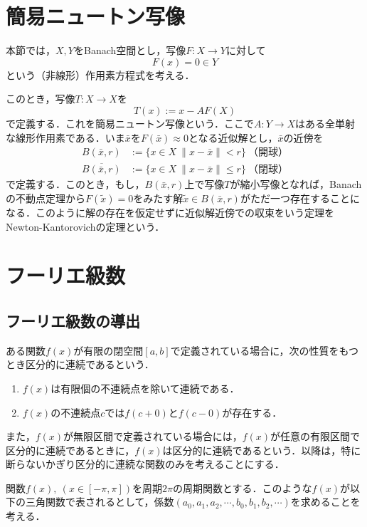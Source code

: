 \documentclass[11pt,a4paper,titlepage]{jsreport}
\theoremstyle{definition}
\begin{document}
\section{簡易ニュートン写像}
本節では，$X,Y$をBanach空間とし，写像$F:X\rightarrow Y$に対して
\begin{equation*}
  F(x)=0 \in Y
\end{equation*}
という（非線形）作用素方程式を考える．

このとき，写像$T:X\rightarrow X$を
\begin{equation*}
  T(x):=x-AF(X)
\end{equation*}
で定義する．これを簡易ニュートン写像という．ここで$A:Y\rightarrow X$はある全単射な線形作用素である．いま$\bar{x}$を$F(\bar{x})\approx 0$となる近似解とし，$\bar{x}$の近傍を
\begin{align*}
  B(\bar{x},r)            & :=\{x\in X\:\|x-\bar{x}\|<r\}\ （開球）     \\
  \overline{B(\bar{x},r)} & :=\{x\in X\:\|x-\bar{x}\|\leq r\}\ （閉球）
\end{align*}
で定義する．このとき，もし，$B(\bar{x},r)$上で写像$T$が縮小写像となれば，Banachの不動点定理から$F(\tilde{x})=0$をみたす解$\tilde{x}\in B(\bar{x},r)$がただ一つ存在することになる．このように解の存在を仮定せずに近似解近傍での収束をいう定理をNewton-Kantorovichの定理という．

\section{フーリエ級数}
\subsection{フーリエ級数の導出}
ある関数$f(x)$が有限の閉空間$[a,b]$で定義されている場合に，次の性質をもつとき区分的に連続であるという．
\begin{enumerate}
  \item $f(x)$は有限個の不連続点を除いて連続である．
  \item $f(x)$の不連続点$c$では$f(c+0)$と$f(c-0)$が存在する．
\end{enumerate}

また，$f(x)$が無限区間で定義されている場合には，$f(x)$が任意の有限区間で区分的に連続であるときに，$f(x)$は区分的に連続であるという．以降は，特に断らないかぎり区分的に連続な関数のみを考えることにする．

関数$f(x),\ (x\in [-\pi,\pi])$を周期$2\pi$の周期関数とする．このような$f(x)$が以下の三角関数で表されるとして，係数$(a_0,a_1,a_2,\cdots,b_0,b_1,b_2,\cdots)$を求めることを考える．
\end{document}
